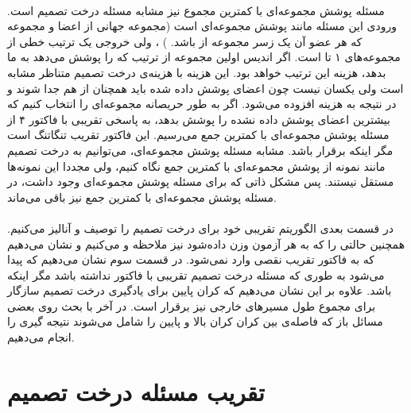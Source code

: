 \documentclass[a4paper]{article}
\begin{document}
	\paragraph{}
	مسئله پوشش مجموعه‌ای با کمترین مجموع نیز مشابه مسئله درخت تصمیم است. ورودی این مسئله مانند پوشش مجموعه‌ای است
	(مجموعه جهانی از اعضا 
	و مجموعه
	که هر عضو آن یک زسر مجموعه از 
	باشد.
	)
	، ولی خروجی یک ترتیب خطی از مجموعه‌های ۱ تا
	است. اگر 
	اندیس اولین مجموعه از ترتیب که 
	را پوشش می‌دهد به ما بدهد، هزینه این ترتیب
	خواهد بود. این هزینه با هزینه‌ی درخت تصمیم متناظر مشابه است ولی یکسان نیست چون اعضای پوشش داده شده باید همچنان
	از هم جدا شوند و در نتیجه به هزینه افزوده می‌شود. اگر به طور حریصانه مجموعه‌ای را انتخاب کنیم که بیشترین اعضای
	پوشش داده نشده را پوشش بدهد، به پاسخی تقریبی با فاکتور ۴ از مسئله پوشش مجموعه‌ای با کمترین جمع می‌رسیم. این فاکتور تقریب تنگاتنگ است مگر اینکه
	برقرار باشد. مشابه مسئله پوشش مجموعه‌ای، می‌توانیم به درخت تصمیم مانند 
	نمونه از پوشش مجموعه‌ای با کمترین جمع نگاه کنیم، ولی مجددا این نمونه‌ها مستقل نیستند. پس مشکل ذاتی که برای
	مسئله پوشش مجموعه‌ای وجود داشت، در مسئله پوشش مجموعه‌ای با کمترین جمع نیز باقی می‌ماند. 
	\paragraph{}
	در قسمت بعدی الگوریتم تقریبی خود برای درخت تصمیم را توصیف و آنالیز می‌کنیم. همچنین حالتی را که به هر آزمون
	وزن داده‌شود نیز ملاحظه و می‌کنیم و نشان می‌دهیم که به فاکتور تقریب 
	نقصی وارد نمی‌شود. در قسمت سوم نشان می‌دهیم که 
	پیدا می‌شود به طوری که مسئله درخت تصمیم تقریبی با فاکتور 
	نداشته باشد مگر اینکه
	باشد. علاوه بر این نشان می‌دهیم که کران پایین برای یادگیری درخت تصمیم سازگار برای مجموع طول مسیرهای خارجی نیز
	برقرار است. در آخر با بحث روی بعضی مسائل باز که فاصله‌ی بین کران کران بالا و پایین را شامل می‌شوند نتیجه گیری
	را انجام می‌دهیم. 
	\section{تقریب مسئله درخت تصمیم}
\end{document}
